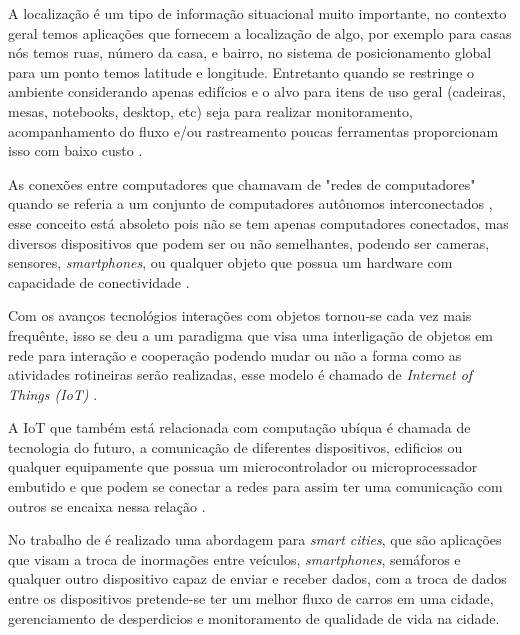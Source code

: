 
A localização é um tipo de informação situacional muito importante, no contexto geral temos aplicações que fornecem a localização de algo, por exemplo para casas nós temos ruas, número da casa, e bairro, no sistema de posicionamento global para um ponto temos  latitude e longitude. Entretanto quando se restringe o ambiente considerando apenas edifícios e o alvo para itens de uso geral (cadeiras, mesas, notebooks, desktop, etc) seja para realizar monitoramento, acompanhamento do fluxo e/ou rastreamento poucas ferramentas proporcionam isso com baixo custo \cite{rfid2009review}.


As  conexões entre computadores que chamavam de 
"redes de computadores" quando se referia a um conjunto de computadores autônomos interconectados \cite{tenenbaum2002}, 
esse conceito está absoleto pois não se tem apenas computadores conectados, mas diversos dispositivos que podem ser ou 
não semelhantes, podendo ser cameras, sensores, \textit{smartphones}, ou qualquer objeto que possua um 
hardware com capacidade de conectividade \cite{iot2016SBRC}.


Com os avanços tecnológios interações com objetos tornou-se cada vez mais frequênte, isso se deu a um paradigma 
que visa uma interligação de objetos em rede para interação e cooperação podendo mudar ou não a forma como as atividades 
rotineiras serão realizadas, esse modelo é chamado de \textit{Internet of Things (IoT)} \cite{realtimeRFID2016}.


A IoT que também está relacionada com computação ubíqua é chamada de tecnologia do futuro, a comunicação de diferentes dispositivos, 
edificios ou qualquer equipamente que possua um microcontrolador ou microprocessador embutido e que podem se conectar a 
redes para assim ter uma comunicação com outros se encaixa nessa relação \cite{mechanismRFID2006}.


No trabalho de  é realizado uma abordagem para \textit{smart cities}, que são aplicações que visam a troca de inormações entre veículos, \textit{smartphones}, semáforos e qualquer outro dispositivo capaz de enviar e receber dados, com a troca de dados entre os dispositivos pretende-se ter um melhor fluxo de carros em uma cidade, gerenciamento de desperdicios e monitoramento de qualidade de vida na cidade. 


